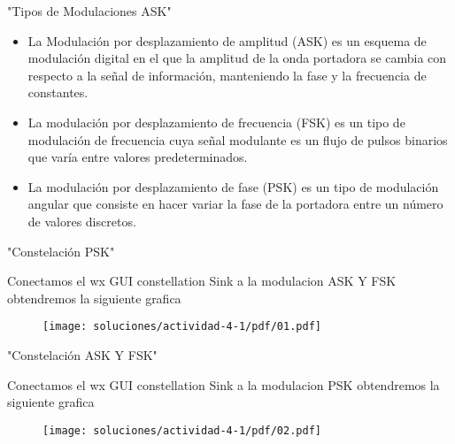 \begin{frame}{"Tipos de Modulaciones ASK"}
\begin{flushleft}
\begin{itemize}
\item {
La  Modulación por desplazamiento de amplitud (ASK) es un esquema de modulación digital en el que la amplitud de la onda portadora se cambia con respecto a la señal de información, manteniendo la fase y la frecuencia de constantes. }
\end{itemize}
\begin{itemize}
\item {
La modulación por desplazamiento de frecuencia (FSK)  es un tipo de modulación de frecuencia cuya señal modulante es un flujo de pulsos binarios que varía entre valores predeterminados. }
\end{itemize}
\begin{itemize}
\item {
La modulación por desplazamiento de fase (PSK) es un tipo de modulación angular que consiste en hacer variar la fase de la portadora entre un número de valores discretos. }
\end{itemize}
\end{flushleft}
\end{frame}

\begin{frame}{"Constelación PSK"}
\begin{flushleft}
Conectamos el wx GUI constellation Sink a la modulacion ASK Y FSK obtendremos la siguiente grafica
\end{flushleft}
\begin{figure}
\texttt{[image: soluciones/actividad-4-1/pdf/01.pdf]}
\end{figure}
\end{frame}


\begin{frame}{"Constelación ASK Y FSK"}
\begin{flushleft}
Conectamos el wx GUI constellation Sink a la modulacion PSK obtendremos la siguiente grafica
\end{flushleft}
\begin{figure}
\texttt{[image: soluciones/actividad-4-1/pdf/02.pdf]}
\end{figure}
\end{frame}